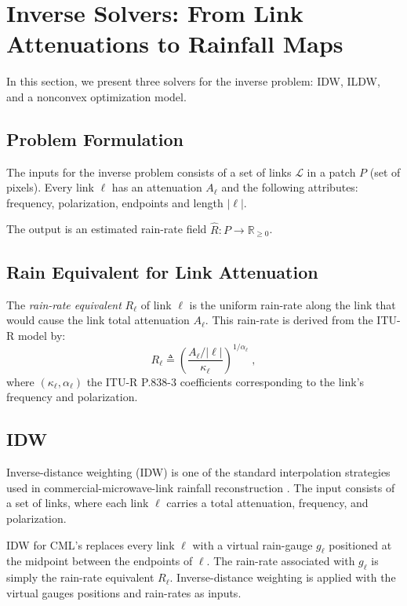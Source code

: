 \documentclass[a4paper,fleqn]{cas-sc}
\newcommand{\notebox}[3]{%
  \begingroup
  \setlength{\fboxsep}{2pt}%
  \fcolorbox{#1}{#2}{\textsf{\footnotesize #3}}%
  \endgroup
}
\DeclareRobustCommand{\editnote}[1]{%
  \texorpdfstring{%
    \nobreak\hfill
    \mbox{\notebox{red!50!black}{red!10}{#1}}%
  }{}%
}
\renewcommand{\editnote}[1]{}
\begin{document}
\section{Inverse Solvers: From Link Attenuations to Rainfall Maps\editnote{GE:stable}}
In this section, we present three solvers for the inverse problem: IDW, ILDW, and a nonconvex optimization model.

\subsection{Problem Formulation}
The inputs for the inverse problem consists of a set of links $\mathcal{L}$ in a patch $P$ (set of pixels). Every link $\ell$ has an attenuation $A_{\ell}$ and the following attributes: frequency, polarization, endpoints and length $|\ell|$.

The output is an estimated rain-rate field $\hat{R}:P\rightarrow \mathbb{R}_{\geq 0}$.

\subsection{Rain Equivalent for Link Attenuation}\label{sec:rain rate equivalent}
The \emph{rain-rate equivalent} $R_{\ell}$ of link $\ell$ is the uniform rain-rate along the link that would cause the link total attenuation $A_\ell$. This rain-rate is derived from the ITU-R model by:
\[
  R_\ell \triangleq \left(\frac{A_\ell/|\ell|}{\kappa_\ell}\right)^{1/\alpha_\ell}\;,
\]
where $(\kappa_\ell,\alpha_\ell)$ the ITU-R P.838-3 coefficients corresponding to the link's frequency and polarization.

\subsection{IDW}
Inverse-distance weighting (IDW) is one of the standard interpolation strategies used in commercial-microwave-link rainfall reconstruction
\citep{zimmerman1999experimental,jin2003comparison_krigbetter,chen2012estimation_idwforrain,chwala2019cml,eshel2020idw,eshel2021quantitative}.
The input consists of a set of links, where each link $\ell$ carries a total attenuation, frequency, and polarization.

IDW for CML's replaces every link $\ell$ with a virtual rain-gauge $g_{\ell}$ positioned at the midpoint between the endpoints of $\ell$. The rain-rate associated with $g_{\ell}$ is simply the rain-rate equivalent $R_{\ell}$. Inverse-distance weighting is applied with the virtual gauges positions and rain-rates as inputs.
\end{document}
